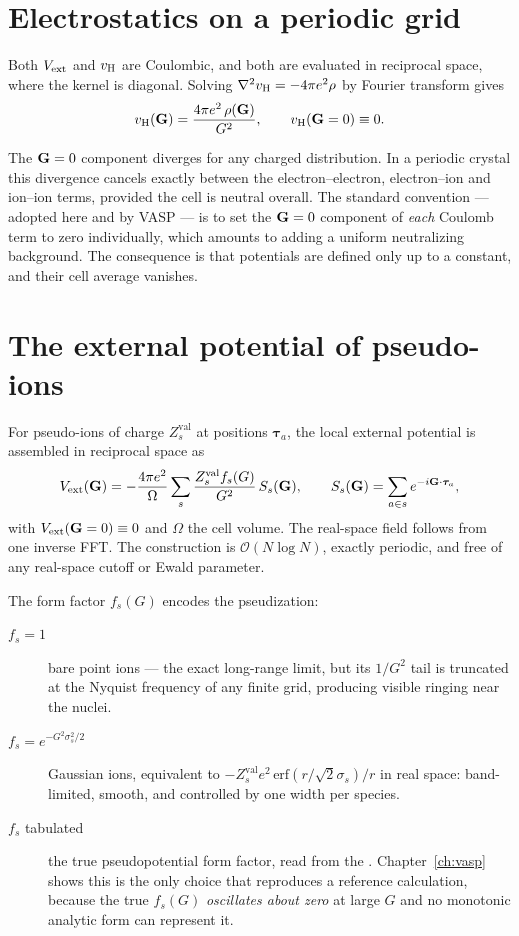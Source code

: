 \section{Electrostatics on a periodic grid}
\label{sec:electrostatics}

Both $V_{\mathrm{ext}}$ and $v_{\mathrm{H}}$ are Coulombic, and both are evaluated in reciprocal
space, where the kernel is diagonal. Solving $\nabla^2 v_{\mathrm{H}} = -4\pi e^2\rho$ by
Fourier transform gives
\begin{equation}
  v_{\mathrm{H}}(\mathbf{G}) = \frac{4\pi e^2\,\rho(\mathbf{G})}{G^2},
  \qquad v_{\mathrm{H}}(\mathbf{G}=0) \equiv 0 .
  \label{eq:hartree}
\end{equation}

The $\mathbf{G}=0$ component diverges for any charged distribution. In a periodic
crystal this divergence cancels exactly between the electron--electron,
electron--ion and ion--ion terms, provided the cell is neutral overall. The
standard convention --- adopted here and by VASP --- is to set the $\mathbf{G}=0$
component of \emph{each} Coulomb term to zero individually, which amounts to
adding a uniform neutralizing background. The consequence is that potentials are
defined only up to a constant, and their cell average vanishes.

\section{The external potential of pseudo-ions}
\label{sec:extpot}

For pseudo-ions of charge $Z^{\mathrm{val}}_s$ at positions $\bm{\tau}_a$, the
local external potential is assembled in reciprocal space as
\begin{equation}
  V_{\mathrm{ext}}(\mathbf{G}) = -\frac{4\pi e^2}{\Omega}
    \sum_{s} \frac{Z^{\mathrm{val}}_{s} f_s(G)}{G^2}\, S_s(\mathbf{G}),
  \qquad
  S_s(\mathbf{G}) = \sum_{a\in s} e^{-i\mathbf{G}\cdot\bm{\tau}_a},
  \label{eq:extpot}
\end{equation}
with $V_{\mathrm{ext}}(\mathbf{G}=0)\equiv 0$ and $\Omega$ the cell volume. The real-space field
follows from one inverse FFT. The construction is $\mathcal{O}(N\log N)$,
exactly periodic, and free of any real-space cutoff or Ewald parameter.

The form factor $f_s(G)$ encodes the pseudization:
\begin{description}
  \item[$f_s = 1$] bare point ions --- the exact long-range limit, but its
    $1/G^2$ tail is truncated at the Nyquist frequency of any finite grid,
    producing visible ringing near the nuclei.
  \item[$f_s = e^{-G^2\sigma_s^2/2}$] Gaussian ions, equivalent to
    $-Z^{\mathrm{val}}_s e^2\,\mathrm{erf}(r/\sqrt{2}\sigma_s)/r$ in real space:
    band-limited, smooth, and controlled by one width per species.
  \item[$f_s$ tabulated] the true pseudopotential form factor, read from the
    . Chapter~\ref{ch:vasp} shows this is the only choice that
    reproduces a reference calculation, because the true $f_s(G)$
    \emph{oscillates about zero} at large $G$ and no monotonic analytic form can
    represent it.
\end{description}

